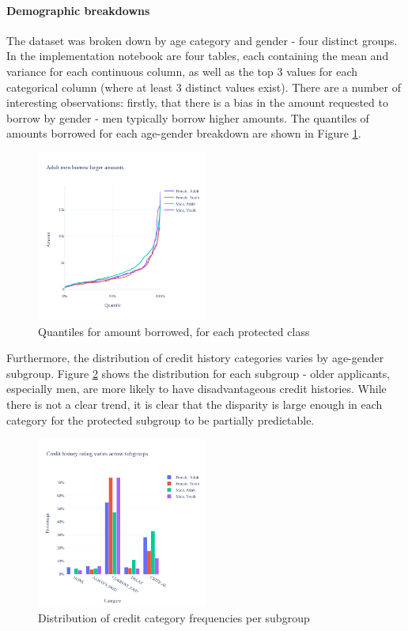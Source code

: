 \documentclass[conference]{IEEEtran}
\begin{document}
\paragraph{Demographic breakdowns} The dataset was broken down by age category and gender - four distinct groups. In the implementation notebook are four tables, each containing the mean and variance for each continuous column, as well as the top 3 values for each categorical column (where at least 3 distinct values exist). There are a number of interesting observations: firstly, that there is a bias in the amount requested to borrow by gender - men typically borrow higher amounts. The quantiles of amounts borrowed for each age-gender breakdown are shown in Figure \ref{fig:quantiles}.
\begin{figure}[h]
    \centering
    \includegraphics[width=0.5\textwidth]{../implementation/images/borrow_quantiles.pdf}
    \caption{Quantiles for amount borrowed, for each protected class}
    \label{fig:quantiles}
\end{figure}
Furthermore, the distribution of credit history categories varies by age-gender subgroup. Figure \ref{fig:credit_cat} shows the distribution for each subgroup - older applicants, especially men, are more likely to have disadvantageous credit histories. While there is not a clear trend, it is clear that the disparity is large enough in each category for the protected subgroup to be partially predictable.
\begin{figure}[h]
    \centering
    \includegraphics[width=0.5\textwidth]{../implementation/images/credit_ratings.pdf}
    \caption{Distribution of credit category frequencies per subgroup}
    \label{fig:credit_cat}
\end{figure}


\end{document}
